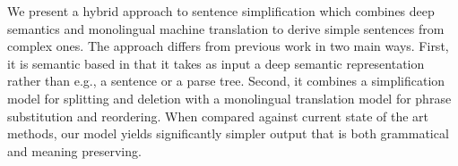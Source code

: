 We present a hybrid approach to sentence simplification which combines deep semantics and monolingual machine translation to derive simple sentences from complex ones. The approach differs from previous work in two main ways. First, it is semantic based in that it takes as input a deep semantic representation rather than e.g., a sentence or a parse tree. Second, it combines a simplification model for splitting and deletion with a monolingual translation model for phrase substitution and reordering. When compared against current state of the art methods, our model yields significantly simpler output that is both grammatical and meaning preserving.

